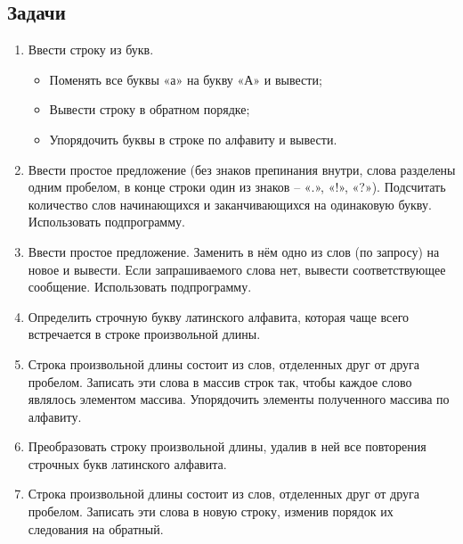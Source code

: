 \documentclass[12pt,a4paper]{report}
\begin{document}
\subsection*{Задачи}
\begin{enumerate}
\item Ввести строку из букв.
\begin{itemize}
\item Поменять все буквы «а» на букву «А» и вывести;
\item Вывести строку в обратном порядке;
\item Упорядочить буквы в строке по алфавиту и вывести.
\end{itemize}   
\item Ввести простое предложение (без знаков препинания внутри, слова разделены одним пробелом, в конце строки один из знаков – «.», «!», «?»). Подсчитать количество слов начинающихся и заканчивающихся на одинаковую букву. Использовать подпрограмму.
\item Ввести простое предложение. Заменить в нём одно из слов (по запросу) на новое и вывести. Если запрашиваемого слова нет, вывести соответствующее сообщение. Использовать подпрограмму.
\item Определить строчную букву латинского алфавита, которая чаще всего встречается в строке произвольной длины.
\item Строка произвольной длины состоит из слов, отделенных друг от друга пробелом. Записать эти слова в массив строк так, чтобы каждое слово являлось элементом массива. Упорядочить элементы полученного массива по алфавиту.
\item Преобразовать строку произвольной длины, удалив в ней все повторения строчных букв латинского алфавита.
\item Строка произвольной длины состоит из слов, отделенных друг от друга пробелом. Записать эти слова в новую строку, изменив порядок их следования на обратный.
\end{enumerate}
\end{document}
